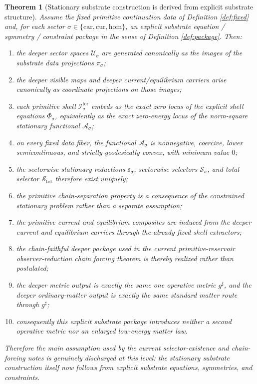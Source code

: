 \documentclass[11pt]{article}
\newcommand{\CompletedMetric}{g^{\sharp}}
\newcommand{\Car}{\mathrm{car}}
\newcommand{\Cur}{\mathrm{cur}}
\newcommand{\Hom}{\mathrm{hom}}
\newcommand{\ForSpace}[1]{\mathcal I_{#1}^{\mathrm{for}}}
\newcommand{\DataProj}[1]{\pi_{#1}}
\newcommand{\ShellEquation}[1]{\Phi_{#1}}
\newcommand{\StationaryFunctional}[1]{\mathscr A_{#1}}
\newcommand{\StationaryReduction}[1]{\mathfrak s_{#1}}
\newcommand{\DeepSpace}[1]{\mathcal U_{#1}}
\newcommand{\ChainSelect}[1]{\mathcal S_{#1}}
\newcommand{\ChainSelectTriple}{\mathcal S_{\mathrm{tot}}}
\newtheorem{theorem}{Theorem}
\begin{document}
\begin{theorem}[Stationary substrate construction is derived from explicit substrate structure]
\label{thm:main}
Assume the fixed primitive continuation data of Definition \ref{def:fixed} and, for each sector \(\sigma\in\{\Car,\Cur,\Hom\}\), an explicit substrate equation / symmetry / constraint package in the sense of Definition \ref{def:package}. Then:
\begin{enumerate}
    \item the deeper sector spaces \(\DeepSpace{\sigma}\) are generated canonically as the images of the substrate data projections \(\DataProj{\sigma}\);
    \item the deeper visible maps and deeper current/equilibrium carriers arise canonically as coordinate projections on those images;
    \item each primitive shell \(\ForSpace{\sigma}\) embeds as the exact zero locus of the explicit shell equations \(\ShellEquation{\sigma}\), equivalently as the exact zero-energy locus of the norm-square stationary functional \(\StationaryFunctional{\sigma}\);
    \item on every fixed data fiber, the functional \(\StationaryFunctional{\sigma}\) is nonnegative, coercive, lower semicontinuous, and strictly geodesically convex, with minimum value \(0\);
    \item the sectorwise stationary reductions \(\StationaryReduction{\sigma}\), sectorwise selectors \(\ChainSelect{\sigma}\), and total selector \(\ChainSelectTriple\) therefore exist uniquely;
    \item the primitive chain-separation property is a consequence of the constrained stationary problem rather than a separate assumption;
    \item the primitive current and equilibrium composites are induced from the deeper current and equilibrium carriers through the already fixed shell extractors;
    \item the chain-faithful deeper package used in the current primitive-reservoir observer-reduction chain forcing theorem is thereby realized rather than postulated;
    \item the deeper metric output is exactly the same one operative metric \(\CompletedMetric\), and the deeper ordinary-matter output is exactly the same standard matter route through \(\CompletedMetric\);
    \item consequently this explicit substrate package introduces neither a second operative metric nor an enlarged low-energy matter law.
\end{enumerate}
Therefore the main assumption used by the current selector-existence and chain-forcing notes is genuinely discharged at this level: the stationary substrate construction itself now follows from explicit substrate equations, symmetries, and constraints.
\end{theorem}
\end{document}
